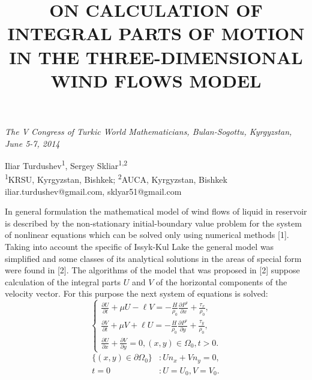 \documentclass[12pt,a4paper,reqno]{amsart}
\begin{document}
\begin{minipage}[b]{15cm}
\footnotesize{\emph{The V Congress of Turkic World Mathematicians,
Bulan-Sogottu, Kyrgyzstan, June 5-7, 2014} \qquad}
\end{minipage}
\bigskip

\title{ON CALCULATION OF INTEGRAL PARTS OF MOTION \\
IN THE THREE-DIMENSIONAL WIND FLOWS MODEL}
\maketitle

\begin{center}
Iliar Turdushev\textsuperscript{1}, Sergey Skliar\textsuperscript{1,2} \\
\textsuperscript{1}KRSU, Kyrgyzstan, Bishkek; \textsuperscript{2}AUCA, Kyrgyzstan,
 Bishkek \\
iliar.turdushev@gmail.com, sklyar51@gmail.com
\end{center}
\bigskip

In general formulation the mathematical model of wind flows of liquid in reservoir is
 described by the non-stationary initial-boundary value problem for the system of
 nonlinear equations which can be solved only using numerical methods [1]. Taking into
 account the specific of Issyk-Kul Lake the general model was simplified and some classes
 of its analytical solutions in the areas of special form were found in [2]. The
 algorithms of the model that was proposed in [2] suppose calculation of the integral
 parts $U$ and $V$ of the horizontal components of the velocity vector. For this purpose
 the next system of equations is solved:
\begin{equation}
\begin{cases}
\displaystyle\frac{\partial U}{\partial t} + \mu U - \ell V =
 -\frac{H}{\rho_0}\frac{\partial P^s}{\partial x} + \frac{\tau_x}{\rho_0}, \\[12pt]
\displaystyle\frac{\partial V}{\partial t} + \mu V + \ell U =
 -\frac{H}{\rho_0}\frac{\partial P^s}{\partial y} + \frac{\tau_y}{\rho_0}, \\[12pt]
\displaystyle\frac{\partial U}{\partial x} + \frac{\partial V}{\partial y} = 0,
 (x, y) \in \Omega_0, t > 0.
\end{cases}
\end{equation}
\begin{align}
\{(x, y) \in \partial \Omega_0\}&: U n_x + V n_y = 0, \\
t = 0&: U = U_0, V = V_0.
\end{align}
\end{document}
